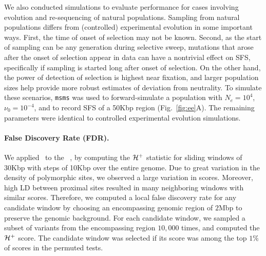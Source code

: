 We also conducted simulations to evaluate performance for cases
involving evolution and re-sequencing of natural populations. Sampling
from natural populations differs from (controlled) experimental
evolution in some important ways. First, the time of onset of
selection may not be known. Second, as the start of sampling can be
any generation during selective sweep, mutations that arose after the
onset of selection appear in data can have a nontrivial effect on SFS,
specifically if sampling is started long after onset of selection. On
the other hand, the power of detection of selection is highest near
fixation, and larger population sizes help provide more robust
estimates of deviation from neutrality. To simulate these scenarios,
\texttt{msms} was used to forward-simulate a population with
$N_e=10^4$, $\nu_0=10^{-4}$, and to record SFS of a 50Kbp region
(Fig.~\ref{fig:ee}A). The remaining parameters were identical to
controlled experimental evolution simulations.

\paragraph{False Discovery Rate (FDR).} We applied \comale\ to the
\datadm~\cite{orozco2012adaptation}, by computing the ${\cal H}^{+}$
statistic for sliding windows of 30Kbp with steps of 10Kbp over the
entire genome. Due to great variation in the density of polymorphic
sites, we observed a large variation in scores. Moreover, high LD
between proximal sites resulted in many neighboring windows with
similar scores. Therefore, we computed a local false discovery rate
for any candidate window by choosing an encompassing genomic region of
$2$Mbp to preserve the genomic background. For each candidate window,
we sampled a subset of variants from the encompassing region $10,000$
times, and computed the ${\cal H}^+$ score. The candidate window was
selected if its score was among the top $1\%$ of scores in the
permuted tests.
